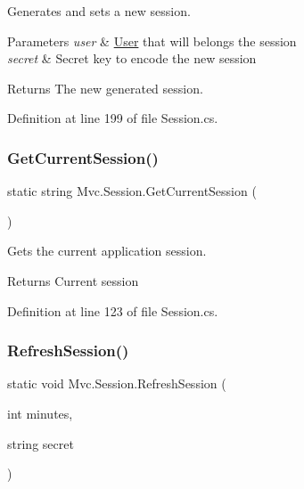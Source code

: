 Generates and sets a new session. 


\begin{DoxyParams}{Parameters}
{\em user} & \hyperlink{class_mvc_1_1_user}{User} that will belongs the session\\
\hline
{\em secret} & Secret key to encode the new session\\
\hline
\end{DoxyParams}
\begin{DoxyReturn}{Returns}
The new generated session.
\end{DoxyReturn}


Definition at line 199 of file Session.\+cs.

\mbox{\label{class_mvc_1_1_session_a0275ee719fa9f087ad8f0b96fc2a88a3}} 
\subsubsection{\texorpdfstring{Get\+Current\+Session()}{GetCurrentSession()}}
{\footnotesize\ttfamily static string Mvc.\+Session.\+Get\+Current\+Session (\begin{DoxyParamCaption}{ }\end{DoxyParamCaption})\hspace{0.3cm}{\ttfamily [static]}}



Gets the current application session. 

\begin{DoxyReturn}{Returns}
Current session
\end{DoxyReturn}


Definition at line 123 of file Session.\+cs.

\mbox{\label{class_mvc_1_1_session_a6af0398d88965bc0f24f0213be2f2096}} 
\subsubsection{\texorpdfstring{Refresh\+Session()}{RefreshSession()}}
{\footnotesize\ttfamily static void Mvc.\+Session.\+Refresh\+Session (\begin{DoxyParamCaption}\item[{int}]{minutes,  }\item[{string}]{secret }\end{DoxyParamCaption})\hspace{0.3cm}{\ttfamily [static]}}



